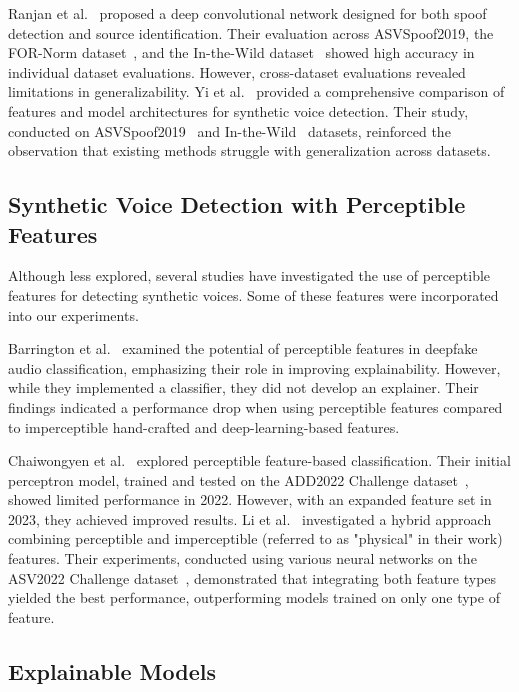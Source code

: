 \documentclass{article}
\begin{document}
Ranjan et al.~\cite{ranjan_statnet_2022} proposed a deep convolutional network designed for both spoof detection and source identification. Their evaluation across ASVSpoof2019\cite{wang_asvspoof_2020}, the FOR-Norm dataset~\cite{reimao_for_2019}, and the In-the-Wild dataset~\cite{muller_does_2022} showed high accuracy in individual dataset evaluations. However, cross-dataset evaluations revealed limitations in generalizability. Yi et al.~\cite{yi_audio_2023} provided a comprehensive comparison of features and model architectures for synthetic voice detection. Their study, conducted on ASVSpoof2019~\cite{wang_asvspoof_2020} and In-the-Wild~\cite{muller_does_2022} datasets, reinforced the observation that existing methods struggle with generalization across datasets.

\subsection{Synthetic Voice Detection with Perceptible Features}

Although less explored, several studies have investigated the use of perceptible features for detecting synthetic voices. Some of these features were incorporated into our experiments.

Barrington et al.~\cite{barrington_single_2023} examined the potential of perceptible features in deepfake audio classification, emphasizing their role in improving explainability. However, while they implemented a classifier, they did not develop an explainer. Their findings indicated a performance drop when using perceptible features compared to imperceptible hand-crafted and deep-learning-based features.

Chaiwongyen et al.~\cite{chaiwongyen_contribution_2022,chaiwongyen_deepfake-speech_2023} explored perceptible feature-based classification. Their initial perceptron model, trained and tested on the ADD2022 Challenge dataset~\cite{yi_add_2024}, showed limited performance in 2022. However, with an expanded feature set in 2023, they achieved improved results. Li et al.~\cite{li_comparative_2022} investigated a hybrid approach combining perceptible and imperceptible (referred to as "physical" in their work) features. Their experiments, conducted using various neural networks on the ASV2022 Challenge dataset~\cite{yi_add_2024}, demonstrated that integrating both feature types yielded the best performance, outperforming models trained on only one type of feature.

\subsection{Explainable Models}
\end{document}
